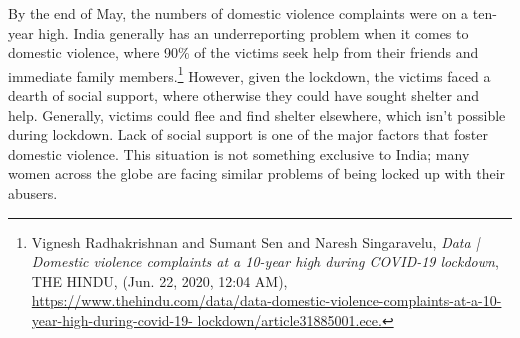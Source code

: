 \begin{multicols}{2}
\noi 
By the end of May, the numbers of domestic violence complaints were on a ten-year high.
India generally has an underreporting problem when it comes to domestic violence, where
90\% of the victims seek help from their friends and immediate family members.\footnote{Vignesh Radhakrishnan and Sumant Sen and Naresh Singaravelu, \textit{Data | Domestic violence complaints at a
10-year high during COVID-19 lockdown}, THE HINDU, (Jun. 22, 2020, 12:04 AM),\\
\url{https://www.thehindu.com/data/data-domestic-violence-complaints-at-a-10-year-high-during-covid-19-
lockdown/article31885001.ece.}} However,
given the lockdown, the victims faced a dearth of social support, where otherwise they could
have sought shelter and help. Generally, victims could flee and find shelter elsewhere, which
isn’t possible during lockdown. Lack of social support is one of the major factors that foster
domestic violence. This situation is not something exclusive to India; many women across the
globe are facing similar problems of being locked up with their abusers. 




\end{multicols}
